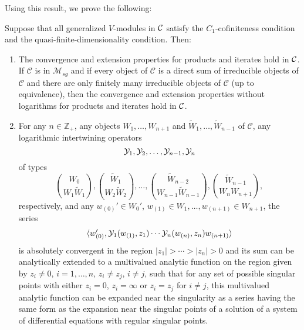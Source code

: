 \documentclass[12pt]{article}
\begin{document}
Using this result, we prove the following:

\setcounter{rema}{7}

\begin{theo}
Suppose that all generalized $V$-modules in ${\cal C}$ satisfy the
$C_{1}$-cofiniteness condition and the quasi-finite-dimensionality
condition.  Then:

\begin{enumerate}

\item The convergence and extension properties for products
and iterates hold in ${\cal C}$. If $\mathcal{C}$ is in
$\mathcal{M}_{sg}$ and if every object of $\mathcal{C}$ is a direct sum
of irreducible objects of $\mathcal{C}$ and there are only finitely
many irreducible objects of $\mathcal{C}$ (up to equivalence), then
the convergence and extension properties without logarithms for
products and iterates hold in ${\cal C}$. 

\item For any $n\in{\mathbb Z}_+$, any objects $W_1, \dots, W_{n+1}$
and $\widetilde{W}_1, \dots, \widetilde{W}_{n-1}$ of $\mathcal{C}$,
any logarithmic intertwining operators
\[
{\cal Y}_{1}, {\cal Y}_{2}, \dots, {\cal
Y}_{n-1}, {\cal Y}_{n}
\]
of types 
\[
{W_{0}\choose
W_{1}\widetilde{W}_{1}}, {\widetilde{W}_{1}\choose
W_{2}\widetilde{W}_{2}}, \dots, {\widetilde{W}_{n-2}\choose
W_{n-1}\widetilde{W}_{n-1}}, {\widetilde{W}_{n-1}\choose
W_{n}W_{n+1}},
\]
respectively, and any $w_{(0)}'\in W_{0}'$, $w_{(1)}\in W_{1}, \dots,
w_{(n+1)}\in W_{n+1}$, the series
\begin{equation} 
\langle
w_{(0)}', {\cal Y}_{1}(w_{(1)}, z_{1})\cdots {\cal Y}_{n}(w_{(n)},
z_{n})w_{(n+1)}\rangle
\end{equation}
is absolutely convergent in the region $|z_{1}|>\cdots> |z_{n}|>0$ and
its sum can be analytically extended to a multivalued analytic
function on the region given by $z_{i}\ne 0$, $i=1, \dots, n$,
$z_{i}\ne z_{j}$, $i\ne j$, such that for any set of possible singular
points with either $z_{i}=0$, $z_{i}=\infty$ or $z_{i}= z_{j}$ for
$i\ne j$, this multivalued analytic function can be expanded near the
singularity as a series having the same form as the expansion near the
singular points of a solution of a system of differential equations
with regular singular points.

\end{enumerate}
\end{theo}
\end{document}
